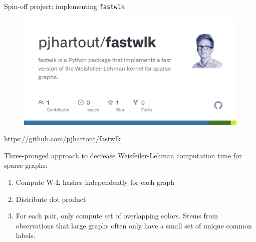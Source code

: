 \documentclass[aspectratio=169, 10pt, dvipsnames, handout]{beamer}
\begin{document}
\begin{frame}[allowframebreaks]{}
  
  

\end{frame}

{
  \begin{frame}[fragile]{Spin-off project: implementing \texttt{fastwlk}}
    \begin{minipage}{0.45\textwidth}
      \begin{figure}
        \centering
        \includegraphics[width=\textwidth]{./figures/fastwlk.png}
      \end{figure}
      \small\url{https://github.com/pjhartout/fastwlk}
    \end{minipage}
    \hfill
    \begin{minipage}{0.45\textwidth}
      \pause Three-pronged approach to decrease Weisfeiler-Lehman computation
      time for sparse graphs:
      \begin{enumerate}
        \pause\item Compute W-L hashes independently for each graph
        \pause\item Distribute dot product
        \pause\item For each pair, only compute set of overlapping colors. Stems
        from observations that large graphs often only have a small set of unique
        common labels.
      \end{enumerate}
    \end{minipage}

  \end{frame}
}
\end{document}
